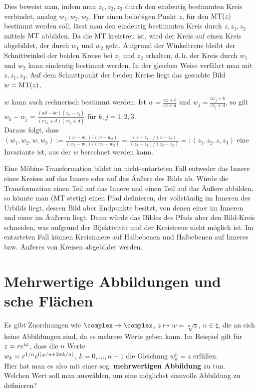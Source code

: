 Dies beweist man, indem man $z_1, z_2, z_3$ durch den eindeutig bestimmten
Kreis verbindet, analog $w_1, w_2, w_3$.
Für einen beliebigen Punkt $z$, für den $\operatorname{MT}(z)$
bestimmt werden soll, lässt man den eindeutig bestimmten Kreis durch
$z, z_1, z_2$ mittels $\operatorname{MT}$ abbilden.
Da die MT kreistreu ist, wird der Kreis auf einen Kreis
abgebildet, der durch $w_1$ und $w_2$ geht.
Aufgrund der Winkeltreue bleibt der Schnittwinkel der beiden Kreise bei
$z_1$ und $z_2$ erhalten, d.\,h. der Kreis durch $w_1$ und $w_2$ kann eindeutig
bestimmt werden.
In der gleichen Weise verfährt man mit $z, z_1, z_3$.
Auf dem Schnittpunkt der beiden Kreise liegt das gesuchte Bild
$w = \operatorname{MT}(z)$.

$w$ kann auch rechnerisch bestimmt werden:
Ist $w = \frac{az + b}{cz + d}$ und $w_j = \frac{a z_j + b}{c z_j + d}$, so
gilt\\
$w_k - w_j = \frac{(ad - bc)(z_k - z_j)}{(c z_k + d)(c z_j + d)}$ für
$k, j = 1, 2, 3$.\\
Daraus folgt, dass
$(w_1, w_2, w, w_3) := \frac{(w - w_1)/(w - w_2)}{(w_3 - w_1)/(w_3 - w_2)} =
\frac{(z - z_1)/(z - z_2)}{(z_3 - z_1)/(z_3 - z_2)} =: (z_1, z_2, z, z_3)$
eine Invariante ist, aus der $w$ berechnet werden kann.

\linie

Eine Möbius-Transformation bildet im nicht-entarteten Fall entweder das Innere
eines Kreises auf das Innere oder auf das Äußere des Bilds ab.
Würde die Transformation einen Teil auf das Innere und einen Teil auf das
Äußere abbilden, so könnte man (MT stetig) einen Pfad definieren, der
vollständig im Inneren des Urbilds liegt, dessen Bild aber Endpunkte besitzt,
von denen einer im Inneren und einer im Äußeren liegt.
Dann würde das Bildes des Pfads aber den Bild-Kreis schneiden, was aufgrund
der Bijektivität und der Kreistreue nicht möglich ist.
Im entarteten Fall können Kreisinnere auf Halbebenen und Halbebenen auf Inneres
bzw. Äußeres von Kreisen abgebildet werden.

\section{%
    Mehrwertige Abbildungen und sche Flächen%
}

Es gibt Zuordnungen wie $\complex \rightarrow \complex$,
$z \mapsto w = \sqrt[n]{z}$, $n \in \natural$,
die an sich keine Abbildungen sind, da es mehrere Werte geben kann.
Im Beispiel gilt für $z = r e^{\mathrm{i}\varphi}$, dass die $n$ Werte\\
$w_k = r^{1/n} e^{\mathrm{i}(\varphi/n + 2\pi k/n)}$, $k = 0, \dotsc, n - 1$
die Gleichung $w_k^n = z$ erfüllen.\\
Hier hat man es also mit einer sog. \textbf{mehrwertigen Abbildung} zu tun.\\
Welchen Wert soll man auswählen, um eine möglichst sinnvolle Abbildung
zu definieren?

